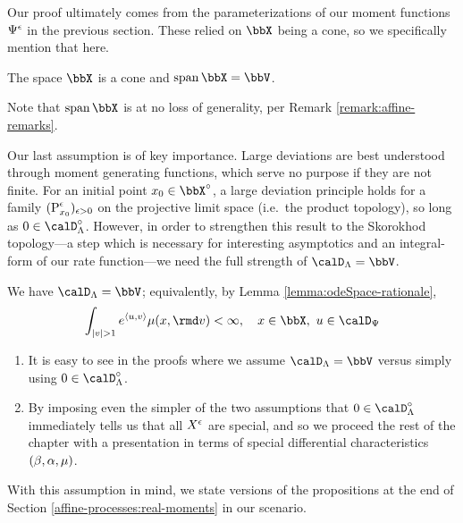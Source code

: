 Our proof ultimately comes from the parameterizations of our moment functions $\Psi^\epsilon$ in the previous section.
These relied on $\stateSpace$ being a cone, so we specifically mention that here.
\begin{assumption}
  The space $\stateSpace$ is a cone and $\operatorname{span}\stateSpace = \vecSpace$.
\end{assumption}
\begin{remark}
  Note that $\operatorname{span}\stateSpace$ is at no loss of generality, per Remark \ref{remark:affine-remarks}.
\end{remark}

Our last assumption is of key importance.
Large deviations are best understood through moment generating functions, which serve no purpose if they are not finite.
For an initial point $\stateVar_0 \in \stateSpace^\circ$, a large deviation principle holds for a family $({\operatorname{P}}^\epsilon_{x_0})_{\epsilon>0}$ on the projective limit space (i.e.\ the product topology), so long as $0 \in \odeSpace^\circ$.
However, in order to strengthen this result to the Skorokhod topology---a step which is necessary for interesting asymptotics and an integral-form of our rate function---we need the full strength of $\odeSpace = \vecSpace$.
\begin{assumption}
  We have $\odeSpace = \vecSpace$; equivalently, by Lemma \ref{lemma:odeSpace-rationale},
  \begin{equation*}
    \int_{|\markVar| > 1} e^\prj{\momentVar}{\markVar} \affJump(\stateVar, \rmd\markVar) < \infty, \quad \stateVar \in \stateSpace, ~ \momentVar \in \momentSpace
  \end{equation*}
\end{assumption}
\begin{remark}
  \begin{enumerate}[label=(\alph*)]
    \item
      It is easy to see in the proofs where we assume $\odeSpace = \vecSpace$ versus simply using $0 \in \odeSpace^\circ$.
    \item
      By imposing even the simpler of the two assumptions that $0 \in \odeSpace^\circ$ immediately tells us that all $X^\epsilon$ are special, and so we proceed the rest of the chapter with a presentation in terms of special differential characteristics $(\beta, \alpha, \mu)$.
  \end{enumerate}
\end{remark}

With this assumption in mind, we state versions of the propositions at the end of Section \ref{affine-processes:real-moments} in our scenario.


